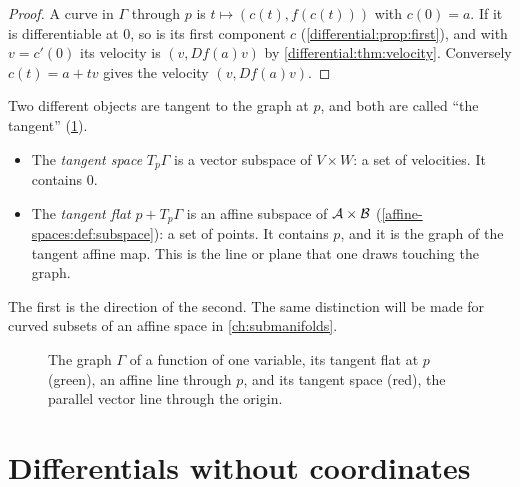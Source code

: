 \begin{notechapter}
\begin{proof}
A curve in $\Gamma$ through $p$ is $t\mapsto(c(t), f(c(t)))$ with
$c(0) = a$. If it is differentiable at $0$, so is its first component $c$
(\cref{differential:prop:first}), and with $v = c'(0)$ its velocity is
$(v, Df(a)v)$ by \cref{differential:thm:velocity}. Conversely
$c(t) = a + tv$ gives the velocity $(v, Df(a)v)$.
\end{proof}

Two different objects are tangent to the graph at $p$, and both are called
``the tangent'' (\cref{differential:fig:flat}).
\begin{itemize}[nosep]
  \item The \emph{tangent space} $T_p\Gamma$ is a vector subspace of
        $V\times W$: a set of velocities. It contains $0$.
  \item The \emph{tangent flat} $p + T_p\Gamma$ is an affine subspace of
        $\mathcal{A}\times\mathcal{B}$ (\cref{affine-spaces:def:subspace}): a set of
        points. It contains $p$, and it is the graph of the tangent affine
        map. This is the line or plane that one draws touching the graph.
\end{itemize}
The first is the direction of the second. The same distinction will be
made for curved subsets of an affine space in \cref{ch:submanifolds}.

\begin{figure}[ht]
\centering
{}
\caption{The graph $\Gamma$ of a function of one variable, its tangent
flat at $p$ (green), an affine line through $p$, and its tangent space
(red), the parallel vector line through the origin.}
\label{differential:fig:flat}
\end{figure}

\section{Differentials without coordinates}
\label{differential:sec:examples}


\end{notechapter}
